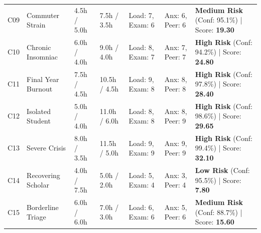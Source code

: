 \documentclass[12pt,a4paper,oneside]{report}
\begin{document}
\begin{table}[H]
\begin{tabularx}{\textwidth}{p{0.6cm}p{1.8cm}p{1.4cm}p{1.6cm}p{1.8cm}p{1.8cm}X}
C09 & Commuter Strain & 4.5h / 5.0h & 7.5h / 3.5h & Load: 7, Exam: 6 & Anx: 6, Peer: 6 & \textbf{Medium Risk} (Conf: 95.1\%) | Score: \textbf{19.30} \\
C10 & Chronic Insomniac & 6.0h / 4.0h & 9.0h / 4.0h & Load: 8, Exam: 7 & Anx: 7, Peer: 7 & \textbf{High Risk} (Conf: 94.2\%) | Score: \textbf{24.80} \\
C11 & Final Year Burnout & 7.5h / 4.5h & 10.5h / 4.5h & Load: 9, Exam: 8 & Anx: 8, Peer: 8 & \textbf{High Risk} (Conf: 97.8\%) | Score: \textbf{28.40} \\
C12 & Isolated Student & 5.0h / 4.0h & 11.0h / 6.0h & Load: 8, Exam: 8 & Anx: 8, Peer: 9 & \textbf{High Risk} (Conf: 98.6\%) | Score: \textbf{29.65} \\
C13 & Severe Crisis & 8.0h / 3.5h & 11.5h / 5.0h & Load: 9, Exam: 9 & Anx: 9, Peer: 9 & \textbf{High Risk} (Conf: 99.4\%) | Score: \textbf{32.10} \\
C14 & Recovering Scholar & 4.0h / 7.5h & 5.0h / 2.0h & Load: 5, Exam: 4 & Anx: 3, Peer: 4 & \textbf{Low Risk} (Conf: 95.5\%) | Score: \textbf{7.80} \\
C15 & Borderline Triage & 6.0h / 6.0h & 7.0h / 3.0h & Load: 6, Exam: 6 & Anx: 5, Peer: 6 & \textbf{Medium Risk} (Conf: 88.7\%) | Score: \textbf{15.60} \\
\bottomrule
\end{tabularx}
\end{table}

\clearpage
\end{document}

